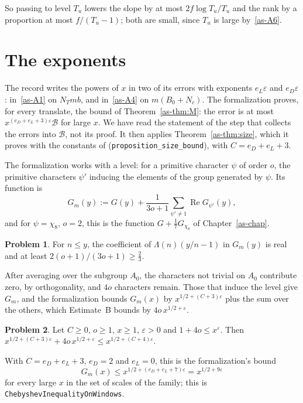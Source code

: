 \documentclass[reqno]{amsart}
\newcounter{chap}
\theoremstyle{definition}
\newtheorem{problem}{Problem}[section]
\theoremstyle{plain}
\newcommand{\Bc}{\mathcal{B}}
\newcommand{\tl}[1]{\texttt{#1}}
\renewcommand{\Re}{\operatorname{Re}}
\begin{document}
So passing to level \(T_u\) lowers the slope by at most \(2f\log T_u/T_u\) and the rank by a proportion at most \(f/(T_u - 1)\); both are small, since \(T_u\) is large by~\eqref{as-A6}.

\section{The exponents}\label{sec:exponents}

The record writes the powers of \(x\) in two of its errors with exponents \(e_L\varepsilon\) and \(e_D\varepsilon\): in~\eqref{as-A1} on \(N_Tmb\), and in~\eqref{as-A4} on \(m(B_0 + N_c)\).  The formalization proves, for every translate, the bound of Theorem~\ref{as-thm:M}: the error is at most \(x^{(e_D + e_L + 3)\varepsilon}\Bc\) for large \(x\).  We have read the statement of the step that collects the errors into \(\Bc\), not its proof.  It then applies Theorem~\ref{as-thm:size}, which it proves with the constants of \cite[Lemma~6.1]{Zh} (\tl{proposition\_size\_bound}), with \(C = e_D + e_L + 3\).

The formalization works with a level: for a primitive character \(\psi\) of order \(o\), the primitive characters \(\psi'\) inducing the elements of the group generated by \(\psi\).  Its function is
\[
  G_m(y) := G(y) + \frac{1}{3o + 1}\sum_{\psi' \ne 1}\Re G_{\psi'}(y) ,
\]
and for \(\psi = \chi_8\), \(o = 2\), this is the function \(G + \frac17G_{\chi_8}\) of Chapter~\ref{as-chap}.

\begin{problem}\label{pr:Gm-positive}
For \(n \le y\), the coefficient of \(\Lambda(n)(y/n - 1)\) in \(G_m(y)\) is real and at least \(2(o + 1)/(3o + 1) \ge \frac23\).
\end{problem}

After averaging over the subgroup \(A_0\), the characters not trivial on \(A_0\) contribute zero, by orthogonality, and \(4o\) characters remain.  Those that induce the level give \(G_m\), and the formalization bounds \(G_m(x)\) by \(x^{1/2+(C+3)\varepsilon}\) plus the sum over the others, which Estimate~B bounds by \(4o\,x^{1/2+\varepsilon}\).

\begin{problem}\label{pr:absorb}
Let \(C \ge 0\), \(o \ge 1\), \(x \ge 1\), \(\varepsilon > 0\) and \(1 + 4o \le x^\varepsilon\).  Then \(x^{1/2+(C+3)\varepsilon} + 4o\,x^{1/2+\varepsilon} \le x^{1/2+(C+4)\varepsilon}\).
\end{problem}

With \(C = e_D + e_L + 3\), \(e_D = 2\) and \(e_L = 0\), this is the formalization's bound
\[
  G_m(x) \le x^{1/2 + (e_D + e_L + 7)\varepsilon} = x^{1/2+9\varepsilon}
\]
for every large \(x\) in the set of scales of the family; this is \tl{Chebyshev\allowbreak{}Inequality\allowbreak{}On\allowbreak{}Windows}.
\end{document}
